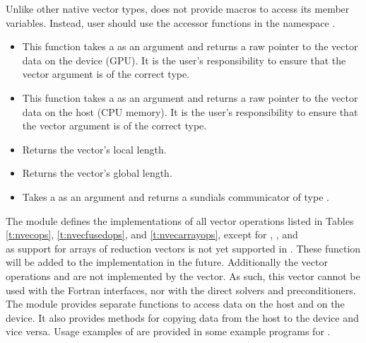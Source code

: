 Unlike other native {\sundials} vector types, {\nvecraja} does not provide macros
to access its member variables. Instead, user should use the accessor functions in
the namespace .
\begin{itemize}

\item

  This function takes a  as an argument and returns a raw pointer to the vector
  data on the device (GPU). It is the user's responsibility to ensure that the vector argument 
  is of the correct  type.

\item

  This function takes a  as an argument and returns a raw pointer to the vector
  data on the host (CPU memory). It is the user's responsibility to ensure that the vector argument 
  is of the correct  type.

\item {}

  Returns the vector's local length.


\item {}

  Returns the vector's global length.


\item {}

  Takes a  as an argument and returns a sundials communicator of type
  .

\end{itemize}


The {\nvecraja} module defines the implementations of all vector operations listed
in Tables \ref{t:nvecops}, \ref{t:nvecfusedops}, and \ref{t:nvecarrayops}, except
for , , and \\ \noindent
{} as support for arrays of reduction vectors is not
yet supported in {\raja}. These function will be added to the {\nvecraja}
implementation in the future. Additionally the vector operations  and
 are not implemented by the {\raja} vector.
As such, this vector cannot be used with the {\sundials} Fortran interfaces,
nor with the {\sundials} direct solvers and preconditioners.
The {\nvecraja} module provides separate functions to access data on the host
and on the device. It also provides methods for copying data from the host to
the device and vice versa. Usage examples of {\nvecraja} are provided in
some example programs for {\cvode} \cite{cvode_ex}.

